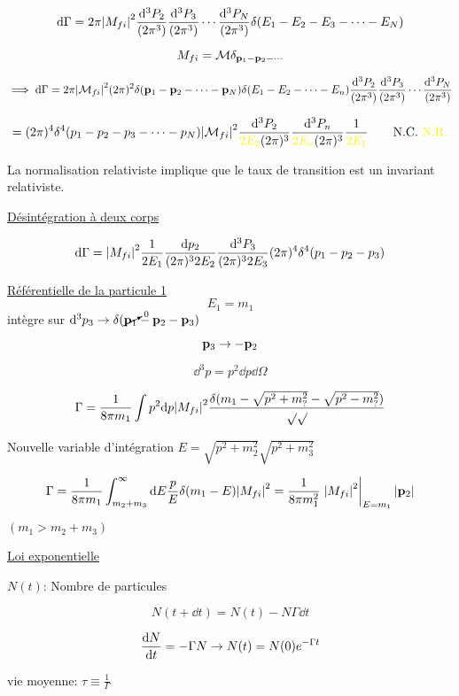 $$ \dd \Gamma = 2\pi \abs{M_{fi} }^{2} \frac{\dd ^3 P_{2}}{(2\pi^3)}  \frac{\dd ^3 P_{3}}{(2\pi^3)} \dotsb \frac{\dd ^3 P_{N}}{(2\pi^3)} \delta(E_1 - E_2 -E_3 - \dotsb -E_N)$$ 

$$M_{fi} = \mathcal{M} \delta_{\vb{p}_1-\vb{p}_2-\dotsb} $$ 

$$\implies \dd \Gamma = 2\pi \abs{\mathcal{M}_{fi}}^{2} (2\pi)^2 \delta(\vb{p}_1-\vb{p}_2-\dotsb-\vb{p}_N)\delta(E_1-E_2-\dotsb-E_n ) \frac{\dd ^3 P_{2}}{(2\pi^3)}  \frac{\dd ^3 P_{3}}{(2\pi^3)} \dotsb \frac{\dd ^3 P_{N}}{(2\pi^3)}$$ 


$$= (2\pi)^4 \delta^{4}(p_1 -p_2 - p_3 -\dotsb-p_N ) \abs{\mathcal{M}_{fi} }^{2} \frac{\dd ^3 P_2 }{\textcolor{yellow}{2E_2} (2\pi)^3} \frac{\dd ^3 P_{n}}{\textcolor{yellow}{2E_n} (2\pi )^3}  \frac{1}{\textcolor{yellow}{2E_1}} \qquad \text{N.C.  \textcolor{yellow}{N.R.}}  $$ 

La normalisation relativiste implique que le taux de transition est un invariant relativiste.

\underline{Désintégration à deux corps} 


$$\dd \Gamma = \abs{M_{fi} }^{2} \frac{1}{2E_{1}} \frac{\dd p_{2}}{(2\pi)^3 2E_{2}} \frac{\dd ^3 P_{3}}{(2\pi)^3 2E_3} (2\pi)^4 \delta^{4}(p_1 -p_2 -p_3 )  $$ 

\underline{Référentielle de la particule 1} 
$$E_1 = m_1$$ 
intègre sur $\dd ^3 p_3 \to \delta( \cancelto{0}{\vb{p}_1}-\vb{p}_2 -\vb{p}_3  )$ 

$$\vb{p}_3 \to - \vb{p}_2$$ 

$$\dd ^3 p = p^{2}\dd p \dd \Omega $$ 


$$\Gamma= \frac{1}{8\pi{}m_1} \int {p^2 \dd p \abs{M_{fi} }^{2}} \frac{\delta(m_1 - \sqrt{p^{2}+m_?^{2}} - \sqrt{p^{2}- m_?^2})}{\sqrt{}\sqrt{}} $$ 

Nouvelle variable d'intégration $E = \sqrt{p^{2}+m_2^2} \sqrt{p^2+m_3^{2}}$ 


$$\Gamma = \frac{1}{8\pi{}m_1} \int_{m_2+m_3}^\infty \dd E \frac{p}{E} \delta(m_1 -E) \abs{M_{fi} }^{2} = \frac{1}{8\pi m_{1}^{2}}\eval{\abs{M_{fi} }^{2}}_{E=m_1 }     \abs{\vb{p}_2}    $$ 

$(m_1 > m_2 + m_3 )$ 

\underline{Loi exponentielle} 

$N(t)$: Nombre de particules 

$$N(t + \dd t) = N(t) - N\Gamma \dd t$$ 

$$\dv{N}{t} = - \Gamma N \to N(t) = N(0) e^{-\Gamma t}$$ 

vie moyenne: $\tau \equiv \frac{1}{\Gamma} $ 



